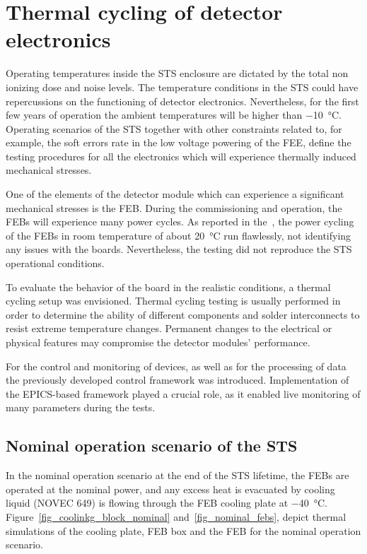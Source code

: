 \newpage
\section{Thermal cycling of detector electronics}
\label{thermal_cycling}
Operating temperatures inside the \gls{STS} enclosure are dictated by the total non ionizing dose and noise levels. The temperature conditions in the STS could have repercussions on the functioning of detector electronics. Nevertheless, for the first few years of operation the ambient temperatures will be higher than \SI{-10}{\celsius}. Operating scenarios of the \gls{STS} together with other constraints related to, for example, the soft errors rate in the low voltage powering of the \gls{FEE}, define the testing procedures for all the electronics which will experience thermally induced mechanical stresses.

One of the elements of the detector module which can experience a significant mechanical stresses is the \gls{FEB}.
During the commissioning and operation, the \glspl{FEB} will experience many power cycles. As reported in the~\cite{CBM_PR_2021}, the power cycling of the \glspl{FEB} in room temperature of about \SI{20}{\celsius} run flawlessly, not identifying any issues with the boards. Nevertheless, the testing did not reproduce the STS operational conditions.

To evaluate the behavior of the board in the realistic conditions, a thermal cycling setup was envisioned. Thermal cycling testing is usually performed in order to determine the ability of different components and solder interconnects to resist extreme temperature changes. Permanent changes to the electrical or physical features may compromise the detector modules' performance.

 For the control and monitoring of devices, as well as for the processing of data the previously developed control framework was introduced. Implementation of the EPICS-based framework played a crucial role, as it enabled live monitoring of many parameters during the tests.

\subsection{Nominal operation scenario of the STS}
\label{nominal}

In the nominal operation scenario at the end of the STS lifetime, the \glspl{FEB} are operated at the nominal power, and any excess heat is evacuated by cooling liquid (NOVEC 649) is flowing through the \gls{FEB} cooling plate at \SI{-40}{\celsius}. Figure~\ref{fig_coolinkg_block_nominal} and~\ref{fig_nominal_febs}, depict thermal simulations of the cooling plate, \gls{FEB} box and the \gls{FEB} for the nominal operation scenario.

